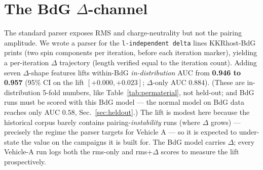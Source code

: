 \documentclass[11pt]{article}
\newcommand{\code}[1]{\texttt{#1}}
\begin{document}
\section{The BdG $\Delta$-channel}
\label{sec:delta}
The standard parser exposes RMS and charge-neutrality but not the pairing amplitude. We wrote a parser
for the \code{l-independent delta} lines KKRhost-BdG prints (two spin components per iteration, before
each iteration marker), yielding a per-iteration $\Delta$ trajectory (length verified equal to the
iteration count). Adding seven $\Delta$-shape features lifts within-BdG \emph{in-distribution} AUC from
\textbf{0.946 to 0.957} (95\% CI on the lift $[+0.000,+0.023]$; $\Delta$-only AUC $0.884$). (These are
in-distribution 5-fold numbers, like Table~\ref{tab:permaterial}, not held-out; and BdG runs must be
scored with this BdG model --- the normal model on BdG data reaches only AUC $0.58$,
Sec.~\ref{sec:heldout}.) The lift is modest here
because the historical corpus barely contains pairing-\emph{instability} runs (where $\Delta$ grows) ---
precisely the regime the parser targets for Vehicle A --- so it is expected to under-state the value on
the campaigns it is built for. The BdG model carries $\Delta$; every Vehicle-A run logs both the rms-only
and rms+$\Delta$ scores to measure the lift prospectively.
\end{document}
